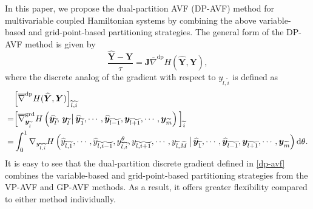 \documentclass[fleqn,11pt]{elsarticle}
\numberwithin{equation}{section}
\begin{document}
In this paper, we propose the dual-partition AVF (DP-AVF) method for multivariable coupled Hamiltonian systems by combining the above variable-based and grid-point-based partitioning strategies. The general form of the DP-AVF method is given by
\begin{equation}\label{dp-avfm}
	\frac{\widehat{\bm Y}-\bm Y}{\tau}=\bm J\overline{\nabla}^{\text{dp}}H(\widehat{\bm Y},\bm Y),
\end{equation}
where the discrete analog of the gradient with respect to $y_{\widetilde{l},\widetilde{i}}$ is defined as
\begin{equation}\label{dp-avf}
	\begin{aligned}
		  & \Big[\overline{\nabla}^{\text{dp}}H(\widehat{\bm Y},\bm Y)\Big]_{\widetilde{l},\widetilde{i}}                                                                                                                                                                                                                                                                                                                                        \\
		= & \Big[\overline{\nabla}^{\text{grd}}_{\bm{y}_{\widetilde{l}}} H\left(\widehat{\bm{y}_{\widetilde{l}}},\, \bm{y}_{\widetilde{l}}\,\big|\,\widehat{\bm{y}}_{\widetilde{1}}, \cdots, \widehat{\bm{y}}_{\widetilde{l-1}},  \bm{y}_{\widetilde{l+1}}, \cdots, \bm{y}_{\widetilde{m}}\right)\Big]_{\widetilde{i}}                                                                                                                               \\
		= & \int_0^1\nabla_{y_{\widetilde{l},\widetilde{i}}} H\left(\widehat{y}_{\widetilde{l},\widetilde{1}},\cdots,\widehat{y}_{\widetilde{l},\widetilde{i-1}}, y_{\widetilde{l},\widetilde{i}}^\theta, {y}_{\widetilde{l},\widetilde{i+1}},\cdots, y_{\widetilde{l},\widetilde{M}}\,\big|\,\widehat{\bm y}_{\widetilde{1}}, \cdots, \widehat{\bm y}_{\widetilde{l-1}}, \bm y_{\widetilde{l+1}},\cdots, \bm y_{\widetilde{m}}\right){\rm d}\theta.
	\end{aligned}
\end{equation}
It is easy to see that the dual-partition discrete gradient defined in \eqref{dp-avf} combines the variable-based and grid-point-based partitioning strategies from the VP-AVF and GP-AVF methods. As a result, it offers greater flexibility compared to either method individually.
\end{document}
